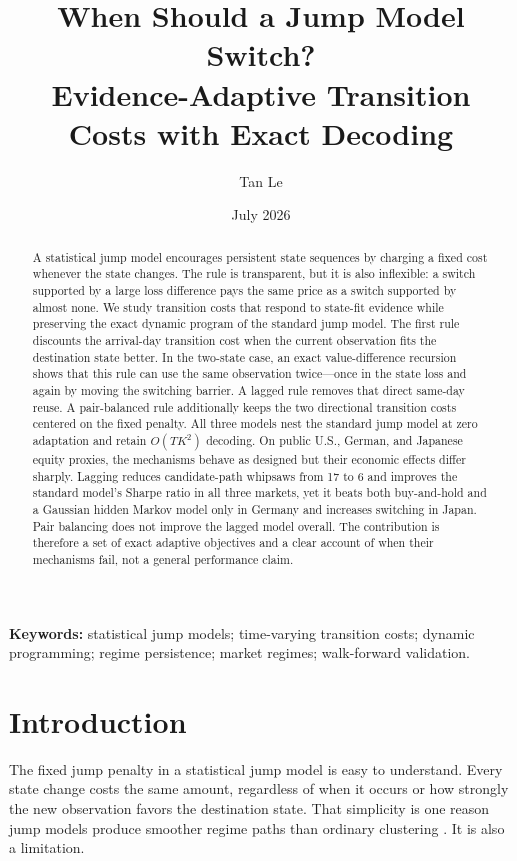\documentclass[11pt]{article}
\title{\textbf{When Should a Jump Model Switch?}\\
Evidence-Adaptive Transition Costs with Exact Decoding}
\author{Tan Le}
\date{July 2026}
\begin{document}
\maketitle

\begin{abstract}
A statistical jump model encourages persistent state sequences by charging a fixed cost whenever the state changes. The rule is transparent, but it is also inflexible: a switch supported by a large loss difference pays the same price as a switch supported by almost none. We study transition costs that respond to state-fit evidence while preserving the exact dynamic program of the standard jump model. The first rule discounts the arrival-day transition cost when the current observation fits the destination state better. In the two-state case, an exact value-difference recursion shows that this rule can use the same observation twice---once in the state loss and again by moving the switching barrier. A lagged rule removes that direct same-day reuse. A pair-balanced rule additionally keeps the two directional transition costs centered on the fixed penalty. All three models nest the standard jump model at zero adaptation and retain $O(TK^2)$ decoding. On public U.S., German, and Japanese equity proxies, the mechanisms behave as designed but their economic effects differ sharply. Lagging reduces candidate-path whipsaws from 17 to 6 and improves the standard model's Sharpe ratio in all three markets, yet it beats both buy-and-hold and a Gaussian hidden Markov model only in Germany and increases switching in Japan. Pair balancing does not improve the lagged model overall. The contribution is therefore a set of exact adaptive objectives and a clear account of when their mechanisms fail, not a general performance claim.
\end{abstract}

\noindent\textbf{Keywords:} statistical jump models; time-varying transition costs; dynamic programming; regime persistence; market regimes; walk-forward validation.

\section{Introduction}

The fixed jump penalty in a statistical jump model is easy to understand. Every state change costs the same amount, regardless of when it occurs or how strongly the new observation favors the destination state. That simplicity is one reason jump models produce smoother regime paths than ordinary clustering \citep{bemporad2018,nystrup2020}. It is also a limitation.
\end{document}
